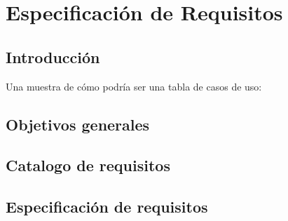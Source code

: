 \chapter{Especificación de Requisitos} %
\label{cha:Especificación de Requisitos}

\section{Introducción}

Una muestra de cómo podría ser una tabla de casos de uso:

\section{Objetivos generales}

\section{Catalogo de requisitos}

\section{Especificación de requisitos}

